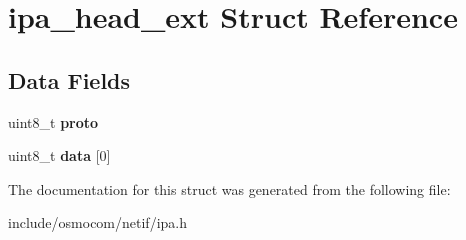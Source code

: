 \section{ipa\+\_\+head\+\_\+ext Struct Reference}
\label{structipa__head__ext}
\subsection*{Data Fields}
\begin{DoxyCompactItemize}
\item 
uint8\+\_\+t {\bfseries proto}\label{structipa__head__ext_a625ac01b022643530d495a1fd661a4a4}

\item 
uint8\+\_\+t {\bfseries data} [0]\label{structipa__head__ext_ab32f6ef1a38d6d8fc23a2a57a17b376c}

\end{DoxyCompactItemize}


The documentation for this struct was generated from the following file\+:\begin{DoxyCompactItemize}
\item 
include/osmocom/netif/ipa.\+h\end{DoxyCompactItemize}
